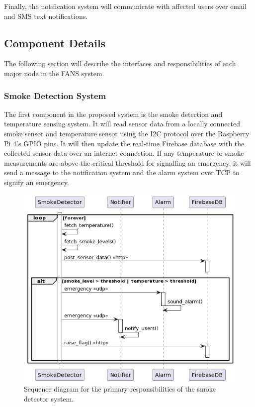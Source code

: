 Finally, the notification system will communicate with affected users over email and SMS text notifications.

\subsection{Component Details}

The following section will describe the interfaces and responsibilities of each major node in the FANS system.

\subsubsection{Smoke Detection System} %

The first component in the proposed system is the smoke detection and temperature sensing system. It will read sensor
data from a locally connected smoke sensor and temperature sensor using the I2C protocol over the Raspberry Pi 4's GPIO
pins. It will then update the real-time Firebase database with the collected sensor data over an internet connection.
If any temperature or smoke measurements are above the critical threshold for signalling an emergency, it will send a
message to the notification system and the alarm system over TCP to signify an emergency.

\begin{figure}[H]
    \centering
    \includegraphics[width=5in]{../assets/SmokeDetectorSequence.png}
    \caption{Sequence diagram for the primary responsibilities of the smoke detector system.}
\end{figure}

